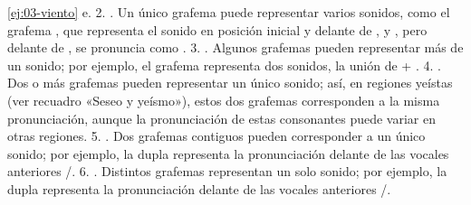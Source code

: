 \begin{solucion}{\ref{ej:03-viento}}
e. 2. . Un único grafema puede representar varios
sonidos, como el grafema , que representa el sonido  en posición
inicial y delante de ,  y , pero delante de ,
 se pronuncia como . 3.
.
Algunos grafemas pueden representar más de un sonido; por ejemplo, el grafema
 representa dos sonidos, la unión de  + . 4.
. Dos
o más grafemas pueden representar un único sonido; así, en regiones yeístas (ver
recuadro «Seseo y yeísmo»), estos dos grafemas corresponden a la misma
pronunciación, aunque la pronunciación de estas consonantes puede variar en
otras regiones. 5. . Dos grafemas contiguos pueden corresponder a
un único sonido; por ejemplo, la dupla  representa la pronunciación
 delante de las vocales anteriores /. 6.
. Distintos grafemas representan un solo
sonido; por ejemplo, la dupla  representa la pronunciación 
delante de las vocales anteriores /.
\end{solucion}

